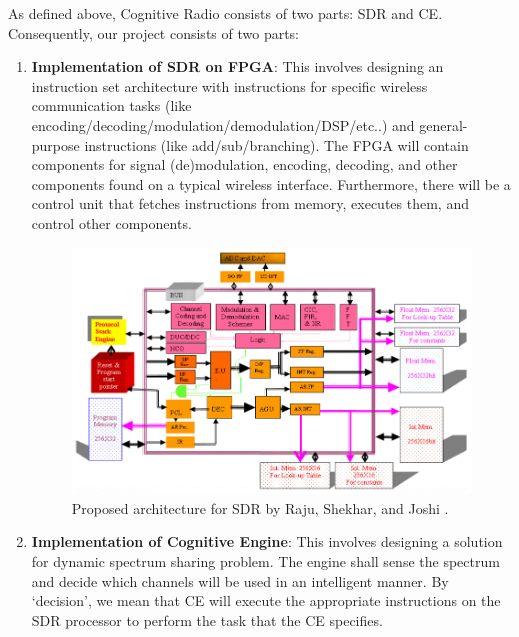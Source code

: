\documentclass[]{scrartcl}
\begin{document}
As defined above, Cognitive Radio consists of two parts: SDR and CE. 
Consequently, our project consists of two parts:

\begin{enumerate}

\item \textbf{Implementation of SDR on FPGA}: This involves designing an 
instruction set architecture with instructions for specific wireless 
communication tasks (like encoding/decoding/modulation/demodulation/DSP/etc..) 
and general-purpose instructions (like add/sub/branching). The FPGA will
contain components for signal (de)modulation, encoding, decoding, and other
components found on a typical wireless interface. Furthermore, there will
be a control unit that fetches instructions from memory, executes
them, and control other components.

\begin{figure}[H]
\begin{center}
  \includegraphics[scale=0.61]{arch.png}
  \caption{Proposed architecture for SDR by Raju, Shekhar, 
           and Joshi \cite{arch}.}
\end{center}
\end{figure}

\item \textbf{Implementation of Cognitive Engine}: This involves designing a 
solution for dynamic spectrum sharing problem. The engine shall sense the 
spectrum and decide which channels will be used in an intelligent manner. 
By `decision', we mean that CE will execute the appropriate instructions on 
the SDR processor to perform the task that the CE specifies.


\end{enumerate}
\end{document}
